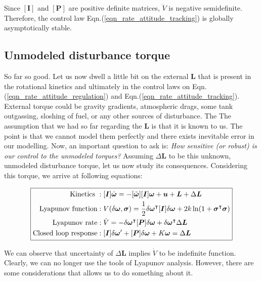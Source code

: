\documentclass{article}
\begin{document}
Since $[\bm{I}]$ and $[\bm{P}]$ are positive definite matrices, $\dddot{V}$ is negative semidefinite. Therefore, the control law Eqn.(\ref{eqn_rate_attitude_tracking}) is globally asymptotically stable.

\subsection{Unmodeled disturbance torque}
So far so good. Let us now dwell a little bit on the external $\bm{L}$ that is present in the rotational kinetics and ultimately in the control laws on Eqn.(\ref{eqn_rate_attitude_regulation}) and Eqn.(\ref{eqn_rate_attitude_tracking}). External torque could be gravity gradients, atmospheric drags, some tank outgassing, sloshing of fuel, or any other sources of disturbance. The  The assumption that we had so far regarding the $\bm{L}$ is that it is known to us. The point is that we cannot model them perfectly and there exists inevitable error in our modelling. Now, an important question to ask is: \textit{How sensitive (or robust) is our control to the unmodeled torques?} Assuming $\Delta\bm{L}$ to be this unknown, unmodeled disturbance torque, let us now study its consequences. Considering this torque, we arrive at following equations:

\begin{equation*}
  \boxed{
  \begin{split}
    \text{Kinetics }&:[\bm{I}]\dot{\bm{\omega}}=-[\tilde{\bm{\omega}}][\bm{I}]\bm{\omega}+\bm{u}+\bm{L}+\Delta\bm{L}\\
    \textnormal{Lyapunov function}&:V(\delta{\bm{\omega}},\bm{\sigma})=\frac{1}{2}\delta\bm{\omega}^{\intercal}[\bm{I}]\delta\bm{\omega}+2k\ln(1+\bm{\sigma}^{\intercal}\bm{\sigma})\\
    \text{Lyapunov rate}&:\dot{V}=-\delta\bm{\omega}^{\intercal}[\bm{P}]\delta\bm{\omega}+\delta\bm{\omega}^{\intercal}\Delta\bm{L}\\
    \text{Closed loop response}&:[\bm{I}]\delta\bm{\omega}'+[\bm{P}]\delta\bm{\omega}+K\bm{\omega}=\Delta\bm{L}
  \end{split}
  }
\end{equation*}

We can observe that uncertainty of $\Delta\bm{L}$ implies $\dot{V}$ to be indefinite function. Clearly, we can no longer use the tools of Lyapunov analysis. However, there are some considerations that allows us to do something about it.
\end{document}
